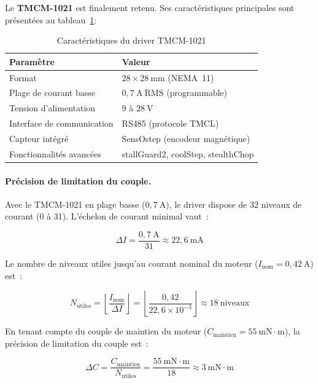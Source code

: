 Le \textbf{TMCM-1021} est finalement retenu. Ses caractéristiques principales
sont présentées au tableau~\ref{tab:specs_driver}:

\begin{table}[H]
  \centering
  \caption{Caractéristiques du driver TMCM-1021}
  \label{tab:specs_driver}
  \begin{tabular}{ll}
    \toprule
    \textbf{Paramètre} & \textbf{Valeur} \\
    \midrule
    Format & $28 \times 28\ \mathrm{mm}$ (NEMA~11) \\
    Plage de courant basse & $0{,}7\ \mathrm{A~RMS}$ (programmable) \\
    Tension d'alimentation & $9$ à $28\ \mathrm{V}$ \\
    Interface de communication & RS485 (protocole TMCL) \\
    Capteur intégré & SensOstep (encodeur magnétique) \\
    Fonctionnalités avancées & stallGuard2, coolStep, stealthChop \\
    \bottomrule
  \end{tabular}
\end{table}

\paragraph{Précision de limitation du couple.}
Avec le TMCM-1021 en plage basse ($0{,}7\ \mathrm{A}$), le driver dispose de 32 niveaux
de courant (0 à 31). L'échelon de courant minimal vaut~:

\begin{equation}
  \Delta I = \frac{0{,}7\ \mathrm{A}}{31} \approx 22{,}6\ \mathrm{mA}
  \label{eq:echelon_courant}
\end{equation}

Le nombre de niveaux utiles jusqu'au courant nominal du moteur ($I_\text{nom} = 0{,}42\ \mathrm{A}$) est~:

\begin{equation}
  N_\text{utiles} = \left\lfloor \frac{I_\text{nom}}{\Delta I} \right\rfloor = \left\lfloor \frac{0{,}42}{22{,}6 \times 10^{-3}} \right\rfloor \approx 18\ \text{niveaux}
  \label{eq:niveaux_utiles}
\end{equation}

En tenant compte du couple de maintien du moteur ($C_\text{maintien} = 55\ \mathrm{mN{\cdot}m}$),
la précision de limitation du couple est~:

\begin{equation}
  \Delta C = \frac{C_\text{maintien}}{N_\text{utiles}} = \frac{55\ \mathrm{mN{\cdot}m}}{18} \approx 3\ \mathrm{mN{\cdot}m}
  \label{eq:precision_couple}
\end{equation}

